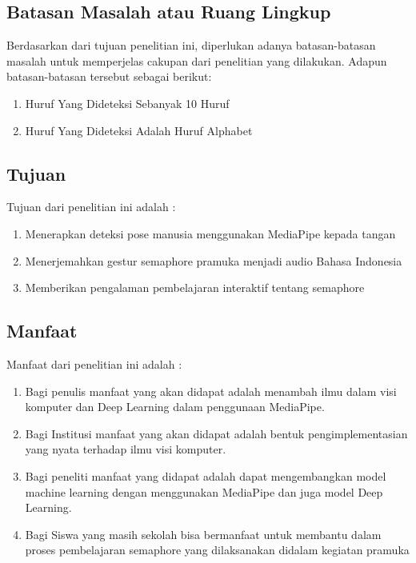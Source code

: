 \subsection{Batasan Masalah atau Ruang Lingkup}

Berdasarkan dari tujuan penelitian ini, diperlukan adanya batasan-batasan masalah untuk memperjelas cakupan dari penelitian yang dilakukan. Adapun batasan-batasan tersebut sebagai berikut:

\begin{enumerate}
\item Huruf Yang Dideteksi Sebanyak 10 Huruf
\item Huruf Yang Dideteksi Adalah Huruf Alphabet 
\end{enumerate}


\subsection{Tujuan}




Tujuan dari penelitian ini adalah :

\begin{enumerate}   
\item	Menerapkan deteksi pose manusia menggunakan MediaPipe kepada tangan
\item	Menerjemahkan gestur semaphore pramuka menjadi audio Bahasa Indonesia
\item	Memberikan pengalaman pembelajaran interaktif tentang semaphore
\end{enumerate}


\subsection{Manfaat}

Manfaat dari penelitian ini adalah : 

\begin{enumerate}  
\item	Bagi penulis manfaat yang akan didapat adalah menambah ilmu dalam visi komputer dan Deep Learning dalam penggunaan MediaPipe.
\item	Bagi Institusi manfaat yang akan didapat adalah bentuk pengimplementasian yang nyata terhadap ilmu visi komputer.
\item	Bagi peneliti manfaat yang didapat adalah dapat mengembangkan model machine learning dengan menggunakan MediaPipe dan juga model Deep Learning.
\item	Bagi Siswa yang masih sekolah bisa bermanfaat untuk membantu dalam proses pembelajaran semaphore yang dilaksanakan didalam kegiatan pramuka
\end{enumerate}
